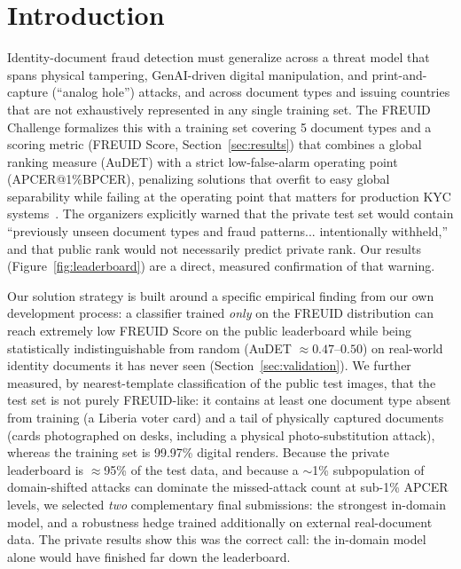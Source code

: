 \documentclass[11pt,a4paper]{article}
\begin{document}
\tableofcontents

\section{Introduction}
\label{sec:intro}
Identity-document fraud detection must generalize across a threat model that spans
physical tampering, GenAI-driven digital manipulation, and print-and-capture
(``analog hole'') attacks, and across document types and issuing countries that are
not exhaustively represented in any single training set. The FREUID Challenge
formalizes this with a training set covering 5 document types and a scoring metric
(FREUID Score, Section~\ref{sec:results}) that combines a global ranking measure
(AuDET) with a strict low-false-alarm operating point (APCER@1\%BPCER), penalizing
solutions that overfit to easy global separability while failing at the
operating point that matters for production KYC systems~\cite{freuid2026}. The
organizers explicitly warned that the private test set would contain
``previously unseen document types and fraud patterns... intentionally
withheld,'' and that public rank would not necessarily predict private rank.
Our results (Figure~\ref{fig:leaderboard}) are a direct, measured
confirmation of that warning.

Our solution strategy is built around a specific empirical finding from our own
development process: a classifier trained \emph{only} on the FREUID distribution
can reach extremely low FREUID Score on the public leaderboard while being
statistically indistinguishable from random (AuDET $\approx 0.47$--$0.50$) on
real-world identity documents it has never seen
(Section~\ref{sec:validation}). We further measured, by nearest-template
classification of the public test images, that the test set is not purely
FREUID-like: it contains at least one document type absent from training (a
Liberia voter card) and a tail of physically captured documents (cards
photographed on desks, including a physical photo-substitution attack), whereas
the training set is 99.97\% digital renders. Because the private leaderboard is
$\approx$95\% of the test data, and because a $\sim$1\% subpopulation of
domain-shifted attacks can dominate the missed-attack count at sub-1\% APCER
levels, we selected \emph{two} complementary final submissions: the strongest
in-domain model, and a robustness hedge trained additionally on external
real-document data. The private results show this was the correct call: the
in-domain model alone would have finished far down the leaderboard.
\end{document}
